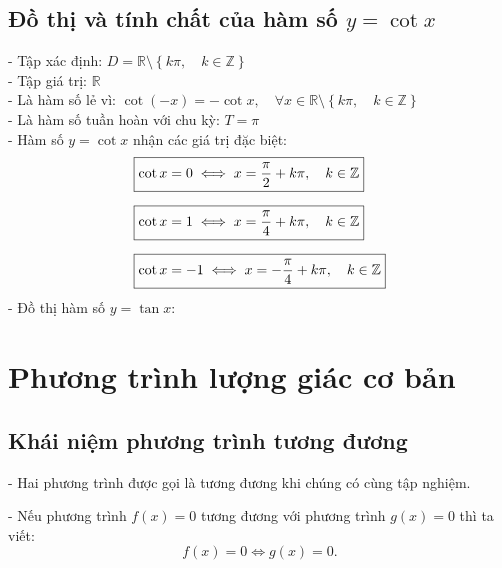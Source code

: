 \subsection{Đồ thị và tính chất của hàm số $y = \cot x$}
\noindent
\hspace*{1cm}
- Tập xác định: $D = \mathbb{R} \setminus \left\{k\pi, \quad k \in \mathbb{Z}\right\}$\\[6pt]
\hspace*{1cm}
- Tập giá trị: $\mathbb{R}$\\[6pt]
\hspace*{1cm}
- Là hàm số lẻ vì: $\cot(-x) = -\cot x, \quad \forall x \in \mathbb{R} \setminus \left\{k\pi, \quad k \in \mathbb{Z}\right\}$\\[6pt]
\hspace*{1cm}
- Là hàm số tuần hoàn với chu kỳ: $T = \pi$\\[6pt]
\hspace*{1cm}
- Hàm số $y = \cot x$ nhận các giá trị đặc biệt:\\[6pt]
\[
    \begin{aligned}
        &\fbox{$\cot x = 0 \iff x = \dfrac{\pi}{2} + k\pi, \quad k \in \mathbb{Z}$}\\[6pt]
        &\fbox{$\cot x = 1 \iff x = \dfrac{\pi}{4} + k\pi, \quad k \in \mathbb{Z}$}\\[6pt]
        &\fbox{$\cot x = -1 \iff x = -\dfrac{\pi}{4} + k\pi, \quad k \in \mathbb{Z}$}
    \end{aligned}
\]
\hspace*{1cm}
- Đồ thị hàm số $y = \tan x$:\\
\begin{center}
    
\end{center}

\section{Phương trình lượng giác cơ bản}

\subsection{Khái niệm phương trình tương đương}
\noindent\hspace*{1cm}- Hai phương trình được gọi là tương đương khi chúng có cùng tập nghiệm.\par\vspace{6pt}
\noindent\hspace*{1cm}- Nếu phương trình $f(x) = 0$ tương đương với phương trình $g(x) = 0$ thì ta viết:
\[
    f(x) = 0 \iff g(x) = 0.
\]

